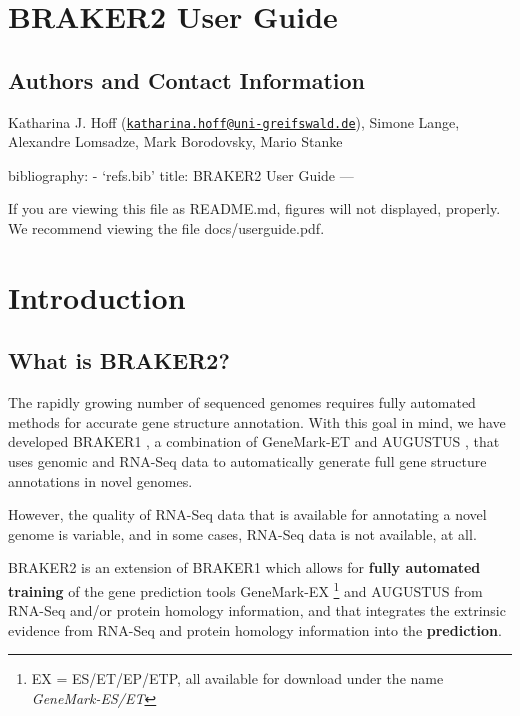 \documentclass[]{article}
\date{}
\begin{document}
\section*{BRAKER2 User Guide}\label{braker2-user-guide}

\subsection*{Authors and Contact
Information}\label{authors-and-contact-information}

Katharina J. Hoff
(\href{mailto:katharina.hoff@uni-greifswald.de}{\nolinkurl{katharina.hoff@uni-greifswald.de}}),
Simone Lange, Alexandre Lomsadze, Mark Borodovsky, Mario Stanke

bibliography: - `refs.bib' title: BRAKER2 User Guide ---

If you are viewing this file as README.md, figures will not displayed, properly. We recommend viewing the file docs/userguide.pdf.

\tableofcontents


\section{Introduction}\label{introduction}

\subsection{What is BRAKER2?}\label{what-is-braker2}

The rapidly growing number of sequenced genomes requires fully automated
methods for accurate gene structure annotation. With this goal in mind,
we have developed BRAKER1 \cite{braker1}, a combination of GeneMark-ET
\cite{GeneMark-ET} and AUGUSTUS \cite{AUGUSTUS,stanke2006gene}, that
uses genomic and RNA-Seq data to automatically generate full gene
structure annotations in novel genomes.

However, the quality of RNA-Seq data that is available for annotating a
novel genome is variable, and in some cases, RNA-Seq data is not
available, at all.

BRAKER2 is an extension of BRAKER1 which allows for \textbf{fully
automated training} of the gene prediction tools GeneMark-EX
\cite{AlexandreLomsadze11282005,ter2008gene,GeneMark-ET}\footnote{EX
  = ES/ET/EP/ETP, all available for download under the name
  \emph{GeneMark-ES/ET}} and AUGUSTUS from RNA-Seq and/or protein
homology information, and that integrates the extrinsic evidence from
RNA-Seq and protein homology information into the \textbf{prediction}.
\end{document}

